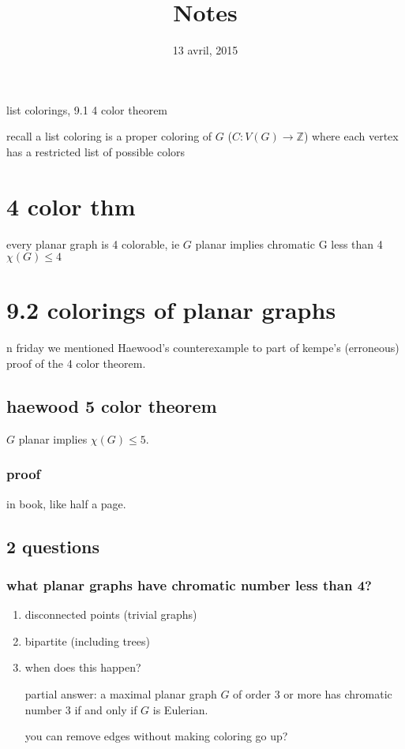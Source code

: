 \documentclass[letterpaper]{article}
\begin{document}
\title{Notes}
\date{13 avril, 2015}
 list colorings,
9.1 4 color theorem

recall a list coloring is a proper coloring of $G$ ($C:V(G)\to\mathbb{Z}$) where each vertex has a restricted list of possible colors

\section*{4 color thm}
every planar graph is 4 colorable, ie $G$ planar implies chromatic G less than 4 $\chi(G)\le 4$

\section*{9.2 colorings of planar graphs}

n friday we mentioned Haewood's counterexample to part of kempe's (erroneous) proof of the 4 color theorem.

\subsection*{haewood 5 color theorem}
$G$ planar implies $\chi(G)\le 5$.

\subsubsection*{proof} in book, like half a page.

\subsection*{2 questions}
\subsubsection*{what planar graphs have chromatic number less than 4?}
\begin{enumerate}
\item
disconnected points (trivial graphs)
\item
bipartite (including trees)
\item
when does this happen?

partial answer:
a maximal planar graph $G$ of order 3 or more has chromatic number 3 if and only if $G$ is Eulerian.

you can remove edges without making coloring go up?
\end{enumerate}
\end{document}
